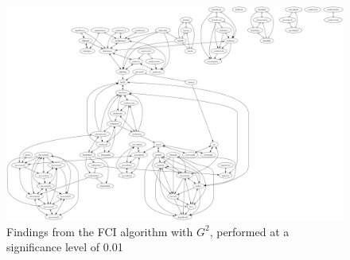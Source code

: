 \begin{figure}[ht]
    \centering
    \includegraphics[scale=0.1]{Report/final_report/pictures/FCI_gsq_0.01_all_UA_78_famdec.png}
    \caption{Findings from the FCI algorithm with $G^2$, performed at a significance level of 0.01}
    \label{fig:fci_gsq_0.01all_UA_78_famdec}
\end{figure}
